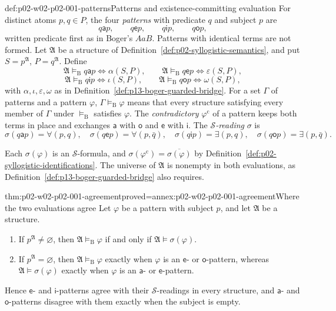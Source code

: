 \begin{hbdefinition}{def:p02-w02-p02-001-patterns}{Patterns and existence-committing evaluation}
For distinct atoms \(p,q\in P\), the four \emph{patterns} with predicate
\(q\) and subject \(p\) are
\[
 q\mathbin{\mathsf a}p,\qquad q\mathbin{\mathsf e}p,\qquad
 q\mathbin{\mathsf i}p,\qquad q\mathbin{\mathsf o}p,
\]
written predicate first as in Boger's \(AaB\). Patterns with identical
terms are not formed. Let \(\mathfrak A\) be a structure of
Definition~\ref{def:p02-syllogistic-semantics}, and put
\(S=p^{\mathfrak A}\), \(P=q^{\mathfrak A}\). Define
\[
 \mathfrak A\models_{\mathrm B}q\mathbin{\mathsf a}p
 \iff\alpha(S,P),\qquad
 \mathfrak A\models_{\mathrm B}q\mathbin{\mathsf e}p
 \iff\varepsilon(S,P),
\]
\[
 \mathfrak A\models_{\mathrm B}q\mathbin{\mathsf i}p
 \iff\iota(S,P),\qquad
 \mathfrak A\models_{\mathrm B}q\mathbin{\mathsf o}p
 \iff\omega(S,P),
\]
with \(\alpha,\iota,\varepsilon,\omega\) as in
Definition~\ref{def:p13-boger-guarded-bridge}. For a set \(\Gamma\) of
patterns and a pattern \(\varphi\), \(\Gamma\models_{\mathrm B}\varphi\)
means that every structure satisfying every member of \(\Gamma\) under
\(\models_{\mathrm B}\) satisfies \(\varphi\). The \emph{contradictory}
\(\varphi^{\mathrm c}\) of a pattern keeps both terms in place and exchanges
\(\mathsf a\) with \(\mathsf o\) and \(\mathsf e\) with \(\mathsf i\).
The \emph{\(\mathcal S\)-reading} \(\sigma\) is
\[
 \sigma(q\mathbin{\mathsf a}p)=\forall(p,q),\quad
 \sigma(q\mathbin{\mathsf e}p)=\forall(p,\bar q),\quad
 \sigma(q\mathbin{\mathsf i}p)=\exists(p,q),\quad
 \sigma(q\mathbin{\mathsf o}p)=\exists(p,\bar q).
\]
\end{hbdefinition}

Each \(\sigma(\varphi)\) is an \(\mathcal S\)-formula, and
\(\sigma(\varphi^{\mathrm c})=\overline{\sigma(\varphi)}\) by
Definition~\ref{def:p02-syllogistic-identifications}. The universe of
\(\mathfrak A\) is nonempty in both evaluations, as
Definition~\ref{def:p13-boger-guarded-bridge} also requires.

\begin{hbtheorem}{thm:p02-w02-p02-001-agreement}{proved=annex:p02-w02-p02-001-agreement}{Where the two evaluations agree}
Let \(\varphi\) be a pattern with subject \(p\), and let \(\mathfrak A\)
be a structure.
\begin{enumerate}
\item If \(p^{\mathfrak A}\ne\varnothing\), then
 \(\mathfrak A\models_{\mathrm B}\varphi\) if and only if
 \(\mathfrak A\models\sigma(\varphi)\).
\item If \(p^{\mathfrak A}=\varnothing\), then
 \(\mathfrak A\models_{\mathrm B}\varphi\) exactly when \(\varphi\) is an
 \(\mathsf e\)- or \(\mathsf o\)-pattern, whereas
 \(\mathfrak A\models\sigma(\varphi)\) exactly when \(\varphi\) is an
 \(\mathsf a\)- or \(\mathsf e\)-pattern.
\end{enumerate}
Hence \(\mathsf e\)- and \(\mathsf i\)-patterns agree with their
\(\mathcal S\)-readings in every structure, and \(\mathsf a\)- and
\(\mathsf o\)-patterns disagree with them exactly when the subject is empty.
\end{hbtheorem}

